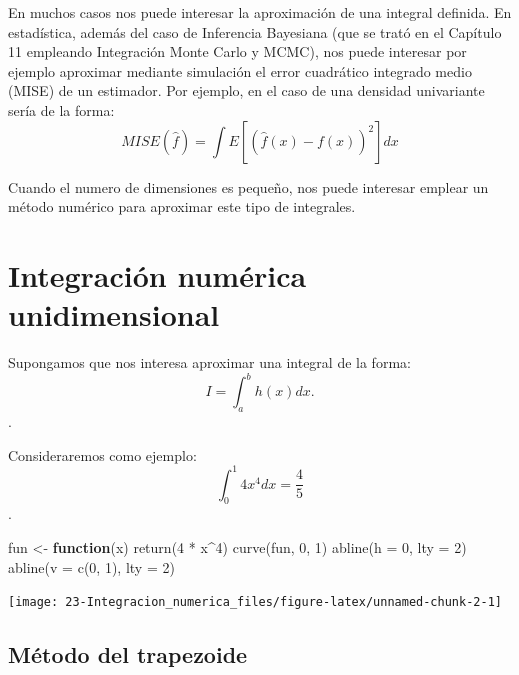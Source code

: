\documentclass[
]{book}
\newenvironment{Shaded}{\begin{snugshade}}{\end{snugshade}}
\newcommand{\AttributeTok}[1]{\textcolor[rgb]{0.77,0.63,0.00}{#1}}
\newcommand{\ControlFlowTok}[1]{\textcolor[rgb]{0.13,0.29,0.53}{\textbf{#1}}}
\newcommand{\DecValTok}[1]{\textcolor[rgb]{0.00,0.00,0.81}{#1}}
\newcommand{\FunctionTok}[1]{\textcolor[rgb]{0.00,0.00,0.00}{#1}}
\newcommand{\NormalTok}[1]{#1}
\newcommand{\OtherTok}[1]{\textcolor[rgb]{0.56,0.35,0.01}{#1}}
\newcommand{\SpecialCharTok}[1]{\textcolor[rgb]{0.00,0.00,0.00}{#1}}
\theoremstyle{break}
\theoremstyle{nonumberplain}
\begin{document}
En muchos casos nos puede interesar la aproximación de una integral definida.
En estadística, además del caso de Inferencia Bayesiana (que se trató en el Capítulo 11 empleando Integración Monte Carlo y MCMC), nos puede interesar por ejemplo aproximar mediante simulación el error cuadrático integrado medio (MISE) de un estimador.
Por ejemplo, en el caso de una densidad univariante sería de la forma:
\[MISE\left( \hat{f} \right) =\int E\left[ \left( \hat{f}(x) - f(x) \right)^2\right] dx\]

Cuando el numero de dimensiones es pequeño, nos puede interesar emplear un método numérico para aproximar este tipo de integrales.

\hypertarget{integraciuxf3n-numuxe9rica-unidimensional}{%
\section{Integración numérica unidimensional}\label{integraciuxf3n-numuxe9rica-unidimensional}}

Supongamos que nos interesa aproximar una integral de la forma:
\[I = \int_a^b h(x)  dx.\].

Consideraremos como ejemplo:
\[\int_0^1 4x^4 dx = \frac{4}{5}\].

\begin{Shaded}
\begin{Highlighting}[]
\NormalTok{fun }\OtherTok{\textless{}{-}} \ControlFlowTok{function}\NormalTok{(x) }\FunctionTok{return}\NormalTok{(}\DecValTok{4} \SpecialCharTok{*}\NormalTok{ x}\SpecialCharTok{\^{}}\DecValTok{4}\NormalTok{)}
\FunctionTok{curve}\NormalTok{(fun, }\DecValTok{0}\NormalTok{, }\DecValTok{1}\NormalTok{)}
\FunctionTok{abline}\NormalTok{(}\AttributeTok{h =} \DecValTok{0}\NormalTok{, }\AttributeTok{lty =} \DecValTok{2}\NormalTok{)}
\FunctionTok{abline}\NormalTok{(}\AttributeTok{v =} \FunctionTok{c}\NormalTok{(}\DecValTok{0}\NormalTok{, }\DecValTok{1}\NormalTok{), }\AttributeTok{lty =} \DecValTok{2}\NormalTok{)}
\end{Highlighting}
\end{Shaded}

\begin{center}\texttt{[image: 23-Integracion\_numerica\_files/figure-latex/unnamed-chunk-2-1]} \end{center}

\hypertarget{muxe9todo-del-trapezoide}{%
\subsection{Método del trapezoide}\label{muxe9todo-del-trapezoide}}
\end{document}
